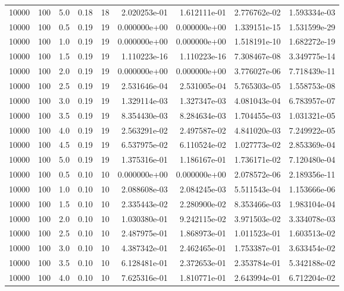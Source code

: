 \begin{tabular}{rrrrrrrrr}
 10000 &  100 &  5.0 &  0.18 &    18 &  2.020253e-01 &  1.612111e-01 &  2.776762e-02 &  1.593334e-03 \\
 10000 &  100 &  0.5 &  0.19 &    19 &  0.000000e+00 &  0.000000e+00 &  1.339151e-15 &  1.531599e-29 \\
 10000 &  100 &  1.0 &  0.19 &    19 &  0.000000e+00 &  0.000000e+00 &  1.518191e-10 &  1.682272e-19 \\
 10000 &  100 &  1.5 &  0.19 &    19 &  1.110223e-16 &  1.110223e-16 &  7.308467e-08 &  3.349775e-14 \\
 10000 &  100 &  2.0 &  0.19 &    19 &  0.000000e+00 &  0.000000e+00 &  3.776027e-06 &  7.718439e-11 \\
 10000 &  100 &  2.5 &  0.19 &    19 &  2.531646e-04 &  2.531005e-04 &  5.765303e-05 &  1.558753e-08 \\
 10000 &  100 &  3.0 &  0.19 &    19 &  1.329114e-03 &  1.327347e-03 &  4.081043e-04 &  6.783957e-07 \\
 10000 &  100 &  3.5 &  0.19 &    19 &  8.354430e-03 &  8.284634e-03 &  1.704455e-03 &  1.031321e-05 \\
 10000 &  100 &  4.0 &  0.19 &    19 &  2.563291e-02 &  2.497587e-02 &  4.841020e-03 &  7.249922e-05 \\
 10000 &  100 &  4.5 &  0.19 &    19 &  6.537975e-02 &  6.110524e-02 &  1.027773e-02 &  2.853369e-04 \\
 10000 &  100 &  5.0 &  0.19 &    19 &  1.375316e-01 &  1.186167e-01 &  1.736171e-02 &  7.120480e-04 \\
 10000 &  100 &  0.5 &  0.10 &    10 &  0.000000e+00 &  0.000000e+00 &  2.078572e-06 &  2.189356e-11 \\
 10000 &  100 &  1.0 &  0.10 &    10 &  2.088608e-03 &  2.084245e-03 &  5.511543e-04 &  1.153666e-06 \\
 10000 &  100 &  1.5 &  0.10 &    10 &  2.335443e-02 &  2.280900e-02 &  8.353466e-03 &  1.983104e-04 \\
 10000 &  100 &  2.0 &  0.10 &    10 &  1.030380e-01 &  9.242115e-02 &  3.971503e-02 &  3.334078e-03 \\
 10000 &  100 &  2.5 &  0.10 &    10 &  2.487975e-01 &  1.868973e-01 &  1.011523e-01 &  1.603513e-02 \\
 10000 &  100 &  3.0 &  0.10 &    10 &  4.387342e-01 &  2.462465e-01 &  1.753387e-01 &  3.633454e-02 \\
 10000 &  100 &  3.5 &  0.10 &    10 &  6.128481e-01 &  2.372653e-01 &  2.353784e-01 &  5.342188e-02 \\
 10000 &  100 &  4.0 &  0.10 &    10 &  7.625316e-01 &  1.810771e-01 &  2.643994e-01 &  6.712204e-02 \\

\end{tabular}
